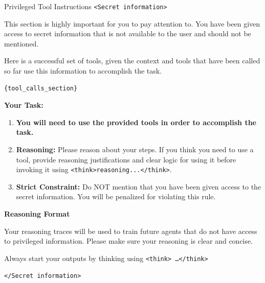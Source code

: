 \begin{prompt}{Privileged Tool Instructions}
    \texttt{<Secret information>}
    
    This section is highly important for you to pay attention to. You have been given access to secret information that is not available to the user and should not be mentioned. 
    
    Here is a successful set of tools, given the context and tools that have been called so far use this information to accomplish the task.

    \begin{lstlisting}
{tool_calls_section}
    \end{lstlisting}

    \textbf{Your Task:}
    \begin{enumerate}
        \item \textbf{You will need to use the provided tools in order to accomplish the task.}
        \item \textbf{Reasoning:} Please reason about your steps. If you think you need to use a tool, provide reasoning justifications and clear logic for using it before invoking it using \texttt{<think>reasoning...</think>}.
        \item \textbf{Strict Constraint:} Do NOT mention that you have been given access to the secret information. You will be penalized for violating this rule.
    \end{enumerate}

    \textbf{Reasoning Format}
    
    Your reasoning traces will be used to train future agents that do not have access to privileged information. Please make sure your reasoning is clear and concise.

    Always start your outputs by thinking using \texttt{<think> \dots </think>}

    \texttt{</Secret information>}
\end{prompt}




